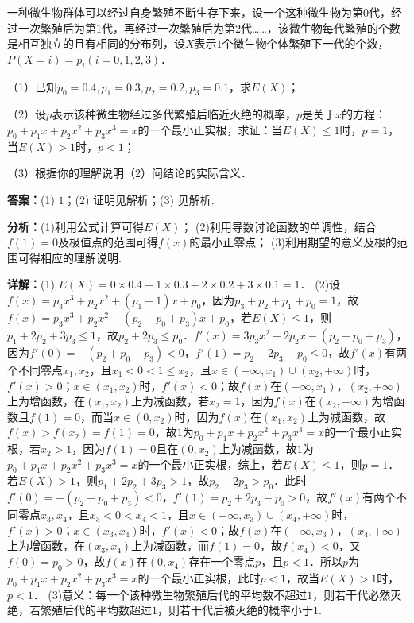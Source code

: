 \begin{question}[points=12]
一种微生物群体可以经过自身繁殖不断生存下来，设一个这种微生物为第$0$代，经过一次繁殖后为第$1$代，再经过一次繁殖后为第$2$代……，该微生物每代繁殖的个数是相互独立的且有相同的分布列，设$X$表示$1$个微生物个体繁殖下一代的个数，$P(X=i)=p_i(i=0,1,2,3)$．

（1）已知$p_0=0.4,p_1=0.3,p_2=0.2,p_3=0.1$，求$E(X)$；

（2）设$p$表示该种微生物经过多代繁殖后临近灭绝的概率，$p$是关于$x$的方程：$p_0+p_1x+p_2x^2+p_3x^3=x$的一个最小正实根，求证：当$E(X)\leq1$时，$p=1$，当$E(X)>1$时，$p<1$；

（3）根据你的理解说明（2）问结论的实际含义．
\begin{solution}
\textbf{答案：}(1) $1$；(2) 证明见解析；(3) 见解析.

\textbf{分析：}(1)利用公式计算可得$E(X)$； (2)利用导数讨论函数的单调性，结合$f(1)=0$及极值点的范围可得$f(x)$的最小正零点； (3)利用期望的意义及根的范围可得相应的理解说明.

\textbf{详解：}(1) $E(X)=0\times0.4+1\times0.3+2\times0.2+3\times0.1=1$． (2)设$f(x)=p_3x^3+p_2x^2+(p_1-1)x+p_0$，因为$p_3+p_2+p_1+p_0=1$，故$f(x)=p_3x^3+p_2x^2-(p_2+p_0+p_3)x+p_0$，若$E(X)\leq1$，则$p_1+2p_2+3p_3\leq1$，故$p_2+2p_3\leq p_0$．$f'(x)=3p_3x^2+2p_2x-(p_2+p_0+p_3)$，因为$f'(0)=-(p_2+p_0+p_3)<0$，$f'(1)=p_2+2p_3-p_0\leq0$，故$f'(x)$有两个不同零点$x_1,x_2$，且$x_1<0<1\leq x_2$，且$x\in(-\infty,x_1)\cup(x_2,+\infty)$时，$f'(x)>0$；$x\in(x_1,x_2)$时，$f'(x)<0$；故$f(x)$在$(-\infty,x_1)$，$(x_2,+\infty)$上为增函数，在$(x_1,x_2)$上为减函数，若$x_2=1$，因为$f(x)$在$(x_2,+\infty)$为增函数且$f(1)=0$，而当$x\in(0,x_2)$时，因为$f(x)$在$(x_1,x_2)$上为减函数，故$f(x)>f(x_2)=f(1)=0$，故$1$为$p_0+p_1x+p_2x^2+p_3x^3=x$的一个最小正实根，若$x_2>1$，因为$f(1)=0$且在$(0,x_2)$上为减函数，故$1$为$p_0+p_1x+p_2x^2+p_3x^3=x$的一个最小正实根，综上，若$E(X)\leq1$，则$p=1$．若$E(X)>1$，则$p_1+2p_2+3p_3>1$，故$p_2+2p_3>p_0$．此时$f'(0)=-(p_2+p_0+p_3)<0$，$f'(1)=p_2+2p_3-p_0>0$，故$f'(x)$有两个不同零点$x_3,x_4$，且$x_3<0<x_4<1$，且$x\in(-\infty,x_3)\cup(x_4,+\infty)$时，$f'(x)>0$；$x\in(x_3,x_4)$时，$f'(x)<0$；故$f(x)$在$(-\infty,x_3)$，$(x_4,+\infty)$上为增函数，在$(x_3,x_4)$上为减函数，而$f(1)=0$，故$f(x_4)<0$，又$f(0)=p_0>0$，故$f(x)$在$(0,x_4)$存在一个零点$p$，且$p<1$．所以$p$为$p_0+p_1x+p_2x^2+p_3x^3=x$的一个最小正实根，此时$p<1$，故当$E(X)>1$时，$p<1$． (3)意义：每一个该种微生物繁殖后代的平均数不超过$1$，则若干代必然灭绝，若繁殖后代的平均数超过$1$，则若干代后被灭绝的概率小于$1$.
\end{solution}
\end{question}

